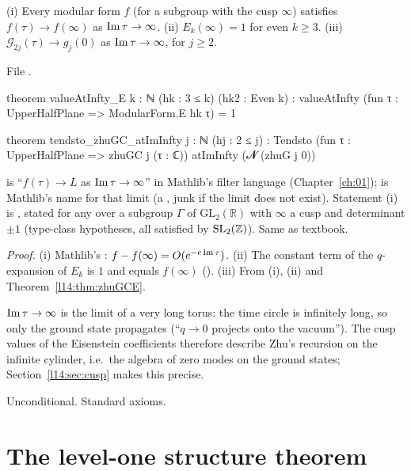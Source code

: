 \begin{theorem}\label{l14:thm:cusplim}
(i) Every modular form $f$ (for a subgroup with the cusp $\infty$) satisfies $f(\tau)\to f(\infty)$ as
$\operatorname{Im}\tau\to\infty$. (ii) $E_k(\infty) = 1$ for even $k\ge3$. (iii) $\mathcal G_{2j}(\tau)\to g_j(0)$ as
$\operatorname{Im}\tau\to\infty$, for $j\ge2$.
\end{theorem}
\noindent File .
\begin{leancode}
theorem valueAtInfty_E {k : ℕ} (hk : 3 ≤ k) (hk2 : Even k) :
    valueAtInfty (fun τ : UpperHalfPlane => ModularForm.E hk τ) = 1

theorem tendsto_zhuGC_atImInfty {j : ℕ} (hj : 2 ≤ j) :
    Tendsto (fun τ : UpperHalfPlane => zhuGC j (τ : ℂ)) atImInfty (𝓝 (zhuG j 0))
\end{leancode}
\begin{dictionary}
 is ``$f(\tau)\to L$ as $\operatorname{Im}\tau\to\infty$'' in Mathlib's filter language
(Chapter~\ref{ch:01});  is Mathlib's name for that limit (a , junk if the limit does not
exist). Statement (i) is , stated for any  over a subgroup $\Gamma$
of $\mathrm{GL}_2(\mathbb R)$ with $\infty$ a cusp and determinant $\pm1$ (type-class hypotheses, all satisfied by
$\mathrm{SL}_2(\mathbb{Z})$). Same as textbook.
\end{dictionary}
\noindent\emph{Proof.} (i) Mathlib's : $f - f(\infty) = O(e^{-c\operatorname{Im}\tau})$. (ii) The
constant term of the $q$-expansion of $E_k$ is $1$ and equals $f(\infty)$ (). (iii) From (i),
(ii) and Theorem~\ref{l14:thm:zhuGCE}.
\begin{physics}
$\operatorname{Im}\tau\to\infty$ is the limit of a very long torus: the time circle is infinitely long, so only the ground state
propagates (``$q\to0$ projects onto the vacuum''). The cusp values of the Eisenstein coefficients therefore describe Zhu's
recursion on the infinite cylinder, i.e.\ the algebra of zero modes on the ground states; Section~\ref{l14:sec:cusp} makes
this precise.
\end{physics}
\begin{status}
Unconditional. Standard axioms.
\end{status}

\section{The level-one structure theorem}\label{l14:sec:levelone}

